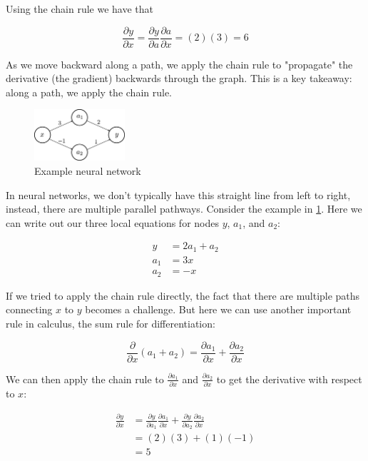\documentclass{article}
\begin{document}
Using the chain rule we have that

\begin{equation}
    \dfrac{\partial y}{\partial x} = \dfrac{\partial y}{\partial a} \dfrac{\partial a}{\partial x} = (2)(3) = 6
\end{equation}

As we move backward along a path, we apply the chain rule to "propagate" the derivative (the gradient) backwards through the graph. This is a key takeaway: along a path, we apply the chain rule.

\begin{figure}[h]
\centering
\includegraphics[width=0.3\textwidth]{./neural_networks_gradients_ex2.eps}
\caption{Example neural network}
\label{fig:ex2}
\end{figure}

In neural networks, we don't typically have this straight line from left to right, instead, there are multiple parallel pathways. Consider the example in \ref{fig:ex2}. Here we can write out our three local equations for nodes $y$, $a_1$, and $a_2$:

\begin{align}
    y &= 2a_1 + a_2 \\
    a_1 &= 3x \\
    a_2 &= -x
\end{align}

If we tried to apply the chain rule directly, the fact that there are multiple paths connecting $x$ to $y$ becomes a challenge. But here we can use another important rule in calculus, the sum rule for differentiation:

\begin{equation}
    \dfrac{\partial}{\partial x} (a_1 + a_2) = \dfrac{\partial a_1}{\partial x} + \dfrac{\partial a_2}{\partial x}
\end{equation}

We can then apply the chain rule to $\frac{\partial a_1}{\partial x}$ and $\frac{\partial a_2}{\partial x}$ to get the derivative with respect to $x$:

\begin{equation}
\begin{split}
    \frac{\partial y}{\partial x} &= \frac{\partial y}{\partial a_1} \frac{\partial a_1}{\partial x} + \frac{\partial y}{\partial a_2} \frac{\partial a_2}{\partial x} \\
    &= (2)(3) + (1)(-1) \\
    &= 5
\end{split}
\end{equation}
\end{document}
